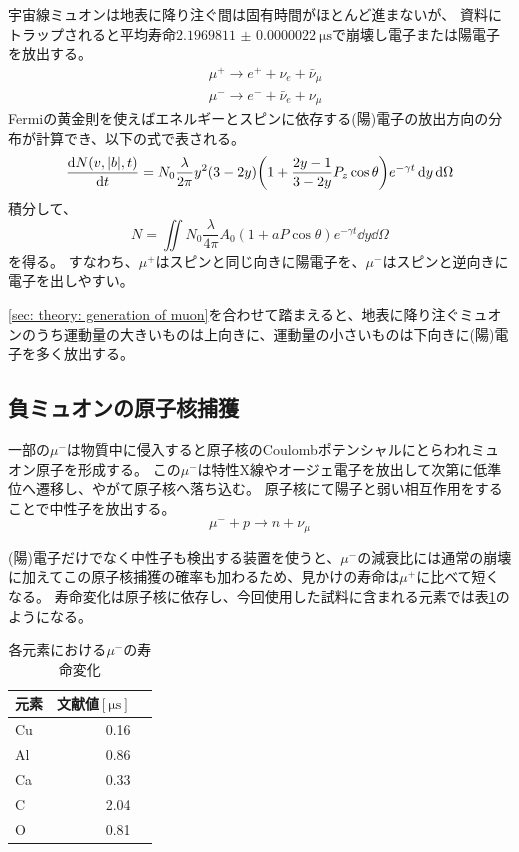 \documentclass[dvipdfmx]{jsarticle}
\begin{document}
宇宙線ミュオンは地表に降り注ぐ間は固有時間がほとんど進まないが、
資料にトラップされると平均寿命$\SI{2.1969811(22)}{\micro\second}$で崩壊し電子または陽電子を放出する。
\begin{align*}
    &\mu^+\to e^++\nu_e+\bar{\nu}_\mu
    \\
    &\mu^-\to e^-+\bar{\nu}_e+\nu_\mu
\end{align*}
Fermiの黄金則を使えばエネルギーとスピンに依存する(陽)電子の放出方向の分布が計算でき、以下の式で表される。
\begin{equation*}
    \dv{N(v,|b|,t)}{t}
    =
    N_0\frac{\lambda}{2\pi}y^2(3-2y)
    \qty(
        1+\frac{2y-1}{3-2y}P_z\cos\theta
    )
    e^{-\gamma t}\dd{y}\dd{\Omega}
\end{equation*}
積分して、
\begin{equation*}
    N=
    \iint N_0\frac{\lambda}{4\pi}
    A_0(1+aP\cos\theta)e^{-\gamma t}
    \dd{y}\dd{\Omega}
\end{equation*}
を得る。
すなわち、$\mu^+$はスピンと同じ向きに陽電子を、$\mu^-$はスピンと逆向きに電子を出しやすい。

\ref{sec: theory: generation of muon}を合わせて踏まえると、地表に降り注ぐミュオンのうち運動量の大きいものは上向きに、運動量の小さいものは下向きに(陽)電子を多く放出する。


\subsection{負ミュオンの原子核捕獲}
\label{sec: theory: negative muon capture}

一部の$\mu^-$は物質中に侵入すると原子核のCoulombポテンシャルにとらわれミュオン原子を形成する。
この$\mu^-$は特性X線やオージェ電子を放出して次第に低準位へ遷移し、やがて原子核へ落ち込む。
原子核にて陽子と弱い相互作用をすることで中性子を放出する。
\begin{equation*}
    \mu^-+p\to n+\nu_\mu
\end{equation*}

(陽)電子だけでなく中性子も検出する装置を使うと、$\mu^-$の減衰比には通常の崩壊に加えてこの原子核捕獲の確率も加わるため、見かけの寿命は$\mu^+$に比べて短くなる。
寿命変化は原子核に依存し、今回使用した試料に含まれる元素では表\ref{table: theory: life of muon}のようになる\cite{Ito Kaji Tabata Yoshiwara}。

\begin{table}
    \centering
    \caption{各元素における$\mu^-$の寿命変化}
    \begin{tabular}{lrr}
        \toprule
        元素 & 文献値$[\unit{\micro\second}]$
        \\
        \midrule
        Cu & 0.16
        \\
        Al & 0.86
        \\
        Ca & 0.33
        \\
        C & 2.04
        \\
        O & 0.81
        \\
        \bottomrule
    \end{tabular}
    \label{table: theory: life of muon}
\end{table}
\end{document}
